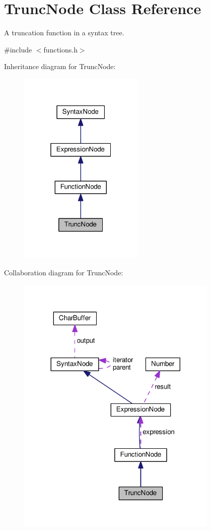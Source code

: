 \hypertarget{classTruncNode}{}\section{Trunc\+Node Class Reference}
\label{classTruncNode}


A truncation function in a syntax tree.  




{\ttfamily \#include $<$functions.\+h$>$}



Inheritance diagram for Trunc\+Node\+:\nopagebreak
\begin{figure}[H]
\begin{center}
\leavevmode
\includegraphics[width=169pt]{classTruncNode__inherit__graph}
\end{center}
\end{figure}


Collaboration diagram for Trunc\+Node\+:\nopagebreak
\begin{figure}[H]
\begin{center}
\leavevmode
\includegraphics[width=272pt]{classTruncNode__coll__graph}
\end{center}
\end{figure}
